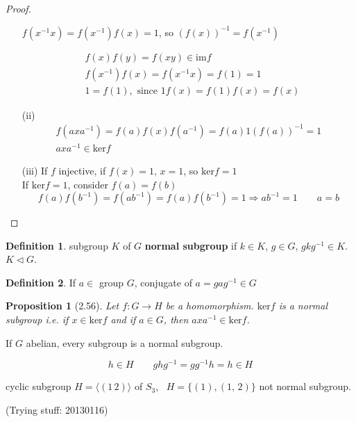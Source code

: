 \documentclass[twoside,landscape]{amsart}
\theoremstyle{plain}
\newtheorem{proposition}{Proposition}
\theoremstyle{definition}
\newtheorem{definition}{Definition}
\theoremstyle{remark}
\begin{document}
\begin{multicols*}{2}
\begin{proof}
\begin{enumerate}
$f(x^{-1}x) = f(x^{-1})f(x) = 1$, so $(f(x))^{-1} = f(x^{-1})$

\[
\begin{aligned}
  & f(x) f(y) = f(xy) \in \text{im}{f} \\ 
  & f(x^{-1}) f(x) = f(x^{-1}x ) = f(1) = 1 \\ 
  &  1 = f(1), \text{ since } 1 f(x) = f(1) f(x) = f(x)
\end{aligned}
\]
\item[(ii)] 
\[
\begin{gathered}
f(axa^{-1}) = f(a) f(x) f(a^{-1}) = f(a) 1 (f(a))^{-1} = 1  \\ 
axa^{-1} \in \text{ker}{f}
\end{gathered}
\]

\item[(iii)] If $f$ injective, if $f(x) = 1$, $x=1$, so $\text{ker}{f} = 1$ \\
If $\text{ker}{f} = 1$, consider $f(a) = f(b)$ 
\[
f(a) f(b^{-1}) = f(ab^{-1}) = f(a) f(b^{-1})=  1 \Longrightarrow ab^{-1} = 1 \quad \quad \boxed{ a = b}
\]
\end{enumerate}
\end{proof}

\begin{definition} subgroup $K$ of $G$ \textbf{normal subgroup} if $k \in K$, $g\in G$, $gkg^{-1} \in K$.  $K \lhd G$.  
\end{definition}


\begin{definition} If $a \in $ group $G$, conjugate of $a = gag^{-1} \in G$
\end{definition}


\begin{proposition}[2.56] Let $f:G\to H$ be a homomorphism.  $ \text{ker}{f}$ is a normal subgroup i.e. if $x\in \text{ker}f$ and if $a\in G$, then $axa^{-1} \in \text{ker}f$.  \end{proposition}

If $G$ abelian, every subgroup is a normal subgroup.  

\[
h \in H \quad \quad gh g^{-1} = gg^{-1} h = h \in H
\]

cyclic subgroup $H=\langle (1 \, 2) \rangle $ of $S_3$, \, $H = \lbrace (1), (1, \, 2) \rbrace$ not normal subgroup.  

(Trying stuff: 20130116)


\end{multicols*}
\end{document}
